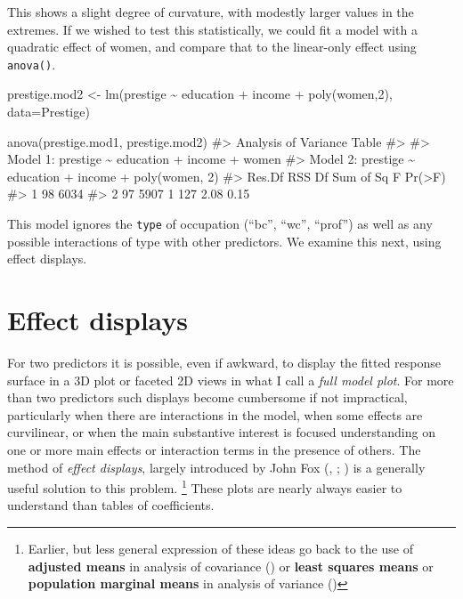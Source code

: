 \documentclass[
  letterpaper,
  10pt,
  krantz2]{krantz}
\makeatletter
\newenvironment{Shaded}{\begin{snugshade}}{\end{snugshade}}
\newcommand{\AttributeTok}[1]{\textcolor[rgb]{0.40,0.45,0.13}{#1}}
\newcommand{\CommentTok}[1]{\textcolor[rgb]{0.37,0.37,0.37}{#1}}
\newcommand{\DecValTok}[1]{\textcolor[rgb]{0.68,0.00,0.00}{#1}}
\newcommand{\FunctionTok}[1]{\textcolor[rgb]{0.28,0.35,0.67}{#1}}
\newcommand{\NormalTok}[1]{\textcolor[rgb]{0.00,0.23,0.31}{#1}}
\newcommand{\OtherTok}[1]{\textcolor[rgb]{0.00,0.23,0.31}{#1}}
\newcommand{\SpecialCharTok}[1]{\textcolor[rgb]{0.37,0.37,0.37}{#1}}
\newenvironment{kframe}{%
  \medskip{}
  \setlength{\fboxsep}{.8em}
  \def\at@end@of@kframe{}%
  \ifinner\ifhmode%
  \def\at@end@of@kframe{\end{minipage}}%
  \begin{minipage}{\columnwidth}%
  \fi\fi%
  \def\FrameCommand##1{\hskip\@totalleftmargin \hskip-\fboxsep
  \colorbox{shadecolor}{##1}\hskip-\fboxsep
      \hskip-\linewidth \hskip-\@totalleftmargin \hskip\columnwidth}%
  \MakeFramed {\advance\hsize-\width
    \@totalleftmargin\z@ \linewidth\hsize
    \@setminipage}}%
{\par\unskip\endMakeFramed%
  \at@end@of@kframe}
\renewenvironment{Shaded}{\begin{kframe}}{\end{kframe}}
\makeatother
\begin{document}
This shows a slight degree of curvature, with modestly larger values in
the extremes. If we wished to test this statistically, we could fit a
model with a quadratic effect of women, and compare that to the
linear-only effect using \texttt{anova()}.

\begin{Shaded}
\begin{Highlighting}[]
\NormalTok{prestige.mod2 }\OtherTok{\textless{}{-}} \FunctionTok{lm}\NormalTok{(prestige }\SpecialCharTok{\textasciitilde{}}\NormalTok{ education }\SpecialCharTok{+}\NormalTok{ income }\SpecialCharTok{+} \FunctionTok{poly}\NormalTok{(women,}\DecValTok{2}\NormalTok{),}
           \AttributeTok{data=}\NormalTok{Prestige)}

\FunctionTok{anova}\NormalTok{(prestige.mod1, prestige.mod2)}
\CommentTok{\#\textgreater{} Analysis of Variance Table}
\CommentTok{\#\textgreater{} }
\CommentTok{\#\textgreater{} Model 1: prestige \textasciitilde{} education + income + women}
\CommentTok{\#\textgreater{} Model 2: prestige \textasciitilde{} education + income + poly(women, 2)}
\CommentTok{\#\textgreater{}   Res.Df  RSS Df Sum of Sq    F Pr(\textgreater{}F)}
\CommentTok{\#\textgreater{} 1     98 6034                         }
\CommentTok{\#\textgreater{} 2     97 5907  1       127 2.08   0.15}
\end{Highlighting}
\end{Shaded}

This model ignores the \texttt{type} of occupation (``bc'', ``wc'',
``prof'') as well as any possible interactions of type with other
predictors. We examine this next, using effect displays.

\section{Effect displays}\label{effect-displays}

For two predictors it is possible, even if awkward, to display the
fitted response surface in a 3D plot or faceted 2D views in what I call
a \emph{full model plot}. For more than two predictors such displays
become cumbersome if not impractical, particularly when there are
interactions in the model, when some effects are curvilinear, or when
the main substantive interest is focused understanding on one or more
main effects or interaction terms in the presence of others. The method
of \emph{effect displays}, largely introduced by John Fox
(, ;
) is a generally
useful solution to this problem. \footnote{Earlier, but less general
  expression of these ideas go back to the use of \textbf{adjusted
  means} in analysis of covariance () or \textbf{least squares means} or \textbf{population marginal
  means} in analysis of variance ()} These plots are nearly always easier to understand
than tables of coefficients.
\end{document}
